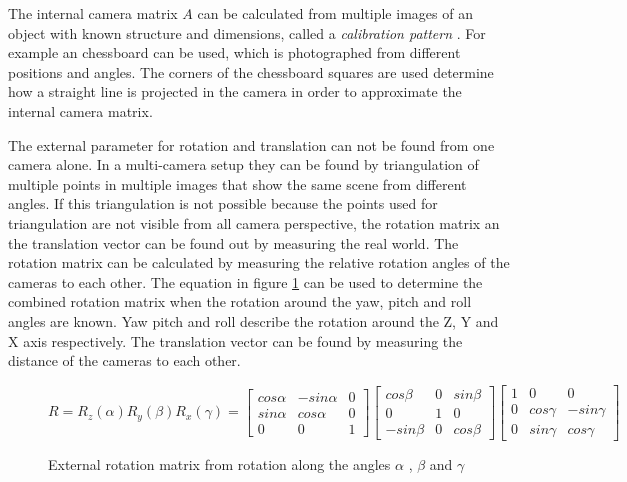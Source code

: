 The internal camera matrix $ A $ can be calculated from multiple images of an object with known structure and dimensions, called a \emph{calibration pattern} \textcite{opencv2018calibration}. 
For example an chessboard can be used, which is photographed from different positions and angles. 
The corners of the chessboard squares are used determine how a straight line is projected in the camera in order to approximate the internal camera matrix.

The external parameter for rotation and translation can not be found from one camera alone.
In a multi-camera setup they can be found by triangulation of multiple points in multiple images that show the same scene from different angles.
If this triangulation is not possible because the points used for triangulation are not visible from all camera perspective, the rotation matrix an the translation vector can be found out by measuring the real world.
The rotation matrix can be calculated by measuring the relative rotation angles of the cameras to each other.
The equation in figure \ref{fig:sota:rotation} can be used to determine the combined rotation matrix when the rotation around the yaw, pitch and roll angles are known. 
Yaw pitch and roll describe the rotation around the Z, Y and X axis respectively.
The translation vector can be found by measuring the distance of the cameras to each other.

\begin{figure}[h!]
\centering
\begin{equation*}
    R
    =
    R_z(\alpha)R_y(\beta)R_x(\gamma)
    =
    \begin{bmatrix}
    cos \alpha{} & - sin \alpha{} & 0 \\
    sin \alpha{} & cos \alpha{} & 0 \\
    0 & 0 & 1 
    \end{bmatrix}
    \begin{bmatrix}
    cos \beta{} & 0 & sin \beta{} \\
    0 & 1 & 0 \\
    - sin \beta{} & 0 & cos \beta{}
    \end{bmatrix}
    \begin{bmatrix}
    1 & 0 & 0 \\
    0 & cos \gamma{} & - sin \gamma{} \\
    0 & sin \gamma{} & cos \gamma{} 
    \end{bmatrix}
\end{equation*}
\caption{External rotation matrix from rotation along the angles $ \alpha{} $ , $ \beta{} $ and $ \gamma{} $ }
\label{fig:sota:rotation}
\end{figure}

